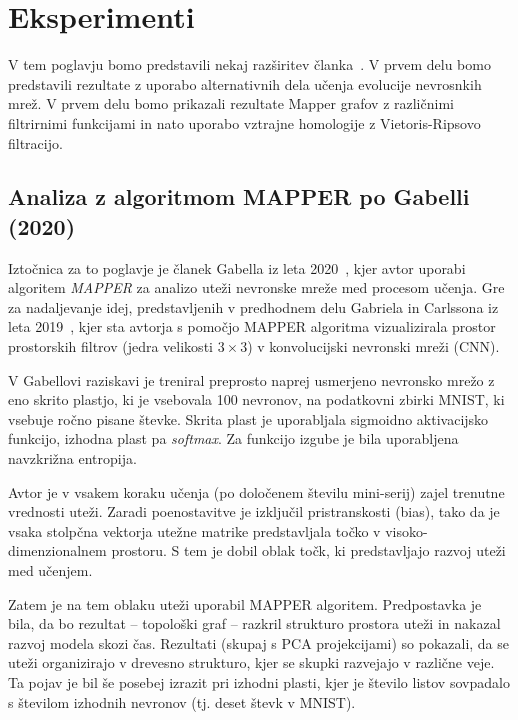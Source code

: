 \chapter{Eksperimenti}

V tem poglavju bomo predstavili nekaj razširitev članka~\cite{Gabella2021}. V prvem delu bomo predstavili rezultate z uporabo alternativnih 
dela učenja evolucije nevrosnkih mrež. V prvem delu bomo prikazali rezultate Mapper grafov z različnimi filtrirnimi funkcijami in nato uporabo vztrajne homologije z Vietoris-Ripsovo filtracijo.


\section{Analiza z algoritmom MAPPER po Gabelli (2020)}

Iztočnica za to poglavje je članek Gabella iz leta 2020~\cite{gabella2020}, kjer avtor uporabi algoritem \textit{MAPPER} za analizo uteži nevronske mreže med procesom učenja. Gre za nadaljevanje idej, predstavljenih v predhodnem delu Gabriela in Carlssona iz leta 2019~\cite{carlsson2019}, kjer sta avtorja s pomočjo MAPPER algoritma vizualizirala prostor prostorskih filtrov (jedra velikosti $3 \times 3$) v konvolucijski nevronski mreži (CNN).

V Gabellovi raziskavi je treniral preprosto naprej usmerjeno nevronsko mrežo z eno skrito plastjo, ki je vsebovala 100 nevronov, na podatkovni zbirki \textsc{MNIST}, ki vsebuje ročno pisane števke. Skrita plast je uporabljala sigmoidno aktivacijsko funkcijo, izhodna plast pa \textit{softmax}. Za funkcijo izgube je bila uporabljena navzkrižna entropija.

Avtor je v vsakem koraku učenja (po določenem številu mini-serij) zajel trenutne vrednosti uteži. Zaradi poenostavitve je izključil pristranskosti (bias), tako da je vsaka stolpčna vektorja utežne matrike predstavljala točko v visoko-dimenzionalnem prostoru. S tem je dobil oblak točk, ki predstavljajo razvoj uteži med učenjem.

Zatem je na tem oblaku uteži uporabil MAPPER algoritem. Predpostavka je bila, da bo rezultat – topološki graf – razkril strukturo prostora uteži in nakazal razvoj modela skozi čas. Rezultati (skupaj s PCA projekcijami) so pokazali, da se uteži organizirajo v drevesno strukturo, kjer se skupki razvejajo v različne veje. Ta pojav je bil še posebej izrazit pri izhodni plasti, kjer je število listov sovpadalo s številom izhodnih nevronov (tj. deset števk v \textsc{MNIST}).

